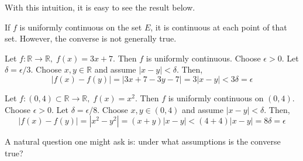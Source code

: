   With this intuition, it is easy to see the result below. 

  \begin{lemma}
    If $f$ is uniformly continuous on the set $E$, it is continuous at each point of that set. However, the converse is not generally true. 
  \end{lemma}

  \begin{example}
    Let $f: \mathbb{R} \longrightarrow \mathbb{R}, \; f(x) = 3x+7$. Then $f$ is uniformly continuous. Choose $\epsilon > 0$. Let $\delta = \epsilon / 3$. Choose $x, y \in \mathbb{R}$ and assume $|x-y| < \delta$. Then, 
    \begin{equation}
      | f(x) - f(y) | = | 3x + 7 - 3 y - 7 | = 3 |x-y| < 3 \delta = \epsilon
    \end{equation}
  \end{example}

  \begin{example}
    Let $f: (0, 4) \subset \mathbb{R} \longrightarrow \mathbb{R}, \; f(x) = x^2$. Then $f$ is uniformly continuous on $(0, 4)$. Choose $\epsilon > 0$. Let $\delta = \epsilon / 8$. Choose $x, y \in (0, 4)$ and assume $|x-y| < \delta$. Then, 
    \begin{equation}
      |f(x) - f(y)| = |x^2 - y^2| = (x+y) |x-y| < (4+4) |x-y| = 8\delta = \epsilon
    \end{equation}
  \end{example}

  A natural question one might ask is: under what assumptions is the converse true?  

